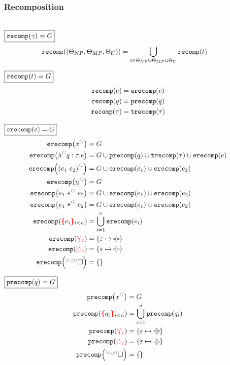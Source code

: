 \subsubsection{Recomposition}\hspace*{\fill} \\

\noindent $\boxed{\recomp{\Grove} = G}$
%
\begin{align*}
  \recomp{(\Set[NP], \Set[MP], \Set[U])} &= \bigcup_{t \in \Set[NP] \cup \Set[MP] \cup \Set[U]} \recomp{t}
\end{align*}

\noindent $\boxed{\recomp{t} = G}$
%
\begin{align*}
  \recomp{e} &= \erecomp{e} \\
  \recomp{q} &= \precomp{q} \\
  \recomp{\tau} &= \trecomp{\tau}
\end{align*}

\noindent $\boxed{\erecomp{e} = G}$
%
\begin{align*}
  \erecomp{\eVar{G}{x}} &= G
  \\
  \erecomp{\eFun{G}{q}{\tau}{e}}
    &= G \cup \precomp{q} \cup \trecomp{\tau} \cup \erecomp{e}
  \\
  \erecomp{\eApp{G}{e_1}{e_2}}
    &= G \cup \erecomp{e_1} \cup \erecomp{e_2}
  \\
  \erecomp{\eNum{G}{n}} &= G
  \\
  \erecomp{\ePlus{G}{e_1}{e_2}}
    &= G \cup \erecomp{e_1} \cup \erecomp{e_2}
  \\
  \erecomp{\eTimes{G}{e_1}{e_2}}
    &= G \cup \erecomp{e_1} \cup \erecomp{e_2}
  \\
  \erecomp{\conflictHole[i < n]{e_i}}
  &= \bigcup_{i=1}^n \erecomp{e_i}
  \\
  \erecomp{\multiVertex{\e}} &= \SetOf{\e \mapsto \Plus}
  \\
  \erecomp{\cycleVertex{\e}} &= \SetOf{\e \mapsto \Plus}
  \\
  \erecomp{\emptyHole{v}{p}} &= \SetOf{}
\end{align*}

\noindent $\boxed{\precomp{q} = G}$
%
\begin{align*}
  \precomp{\pVar{G}{x}} &= G
  \\
  \precomp{\conflictHole[i < n]{q_i}} &= \bigcup_{i=1}^n \precomp{q_i}
  \\
  \precomp{\multiVertex{\e}} &= \SetOf{\e \mapsto \Plus}
  \\
  \precomp{\cycleVertex{\e}} &= \SetOf{\e \mapsto \Plus}
  \\
  \precomp{\emptyHole{v}{p}} &= \SetOf{}
\end{align*}

